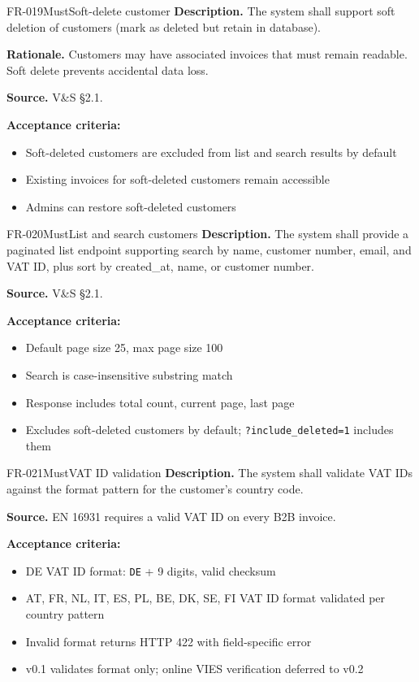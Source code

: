 \documentclass[11pt,a4paper]{article}
\begin{document}
\begin{requirement}{FR-019}{Must}{Soft-delete customer}
\textbf{Description.} The system shall support soft deletion of customers (mark as deleted but retain in database).

\textbf{Rationale.} Customers may have associated invoices that must remain readable. Soft delete prevents accidental data loss.

\textbf{Source.} V\&S \S2.1.

\textbf{Acceptance criteria:}
\begin{itemize}
    \item Soft-deleted customers are excluded from list and search results by default
    \item Existing invoices for soft-deleted customers remain accessible
    \item Admins can restore soft-deleted customers
\end{itemize}
\end{requirement}

\begin{requirement}{FR-020}{Must}{List and search customers}
\textbf{Description.} The system shall provide a paginated list endpoint supporting search by name, customer number, email, and VAT ID, plus sort by created\_at, name, or customer number.

\textbf{Source.} V\&S \S2.1.

\textbf{Acceptance criteria:}
\begin{itemize}
    \item Default page size 25, max page size 100
    \item Search is case-insensitive substring match
    \item Response includes total count, current page, last page
    \item Excludes soft-deleted customers by default; \texttt{?include\_deleted=1} includes them
\end{itemize}
\end{requirement}

\begin{requirement}{FR-021}{Must}{VAT ID validation}
\textbf{Description.} The system shall validate VAT IDs against the format pattern for the customer's country code.

\textbf{Source.} EN 16931 requires a valid VAT ID on every B2B invoice.

\textbf{Acceptance criteria:}
\begin{itemize}
    \item DE VAT ID format: \texttt{DE} + 9 digits, valid checksum
    \item AT, FR, NL, IT, ES, PL, BE, DK, SE, FI VAT ID format validated per country pattern
    \item Invalid format returns HTTP 422 with field-specific error
    \item v0.1 validates format only; online VIES verification deferred to v0.2
\end{itemize}
\end{requirement}
\end{document}
